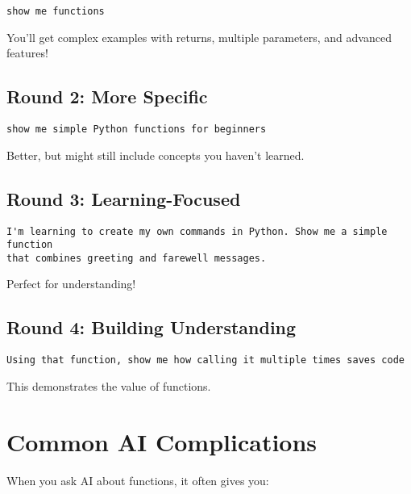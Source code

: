 \documentclass[
  letterpaper,
  DIV=11,
  numbers=noendperiod,
  oneside]{scrreprt}
\begin{document}
\begin{verbatim}
show me functions
\end{verbatim}

You'll get complex examples with returns, multiple parameters, and
advanced features!

\subsection{Round 2: More Specific}\label{round-2-more-specific-4}

\begin{verbatim}
show me simple Python functions for beginners
\end{verbatim}

Better, but might still include concepts you haven't learned.

\subsection{Round 3: Learning-Focused}\label{round-3-learning-focused-5}

\begin{verbatim}
I'm learning to create my own commands in Python. Show me a simple function 
that combines greeting and farewell messages.
\end{verbatim}

Perfect for understanding!

\subsection{Round 4: Building
Understanding}\label{round-4-building-understanding-3}

\begin{verbatim}
Using that function, show me how calling it multiple times saves code
\end{verbatim}

This demonstrates the value of functions.

\section{Common AI Complications}\label{common-ai-complications-5}

When you ask AI about functions, it often gives you:
\end{document}
